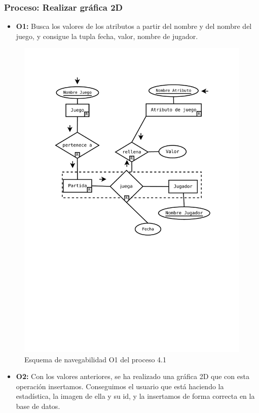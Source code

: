 \subsubsection{Proceso: Realizar gráfica 2D}

\begin{itemize}
	\item \textbf{O1:} Busca los valores de los atributos a partir del nombre y del nombre del juego, y consigue la tupla fecha, valor, nombre de jugador.
\end{itemize}

\begin{figure}[H]
	\centering
	\includegraphics[width=0.5\linewidth]{../Diagramas/pdf/OpEstadisticas3.pdf}
	\caption{Esquema de navegabilidad  O1 del proceso 4.1}
	
	\label{fig:O4.1}
\end{figure}
 \begin{itemize}
 	\item \textbf{O2:} Con los valores anteriores, se ha realizado una gráfica 2D que con esta operación insertamos. Conseguimos el usuario que está haciendo la estadística, la imagen de ella y su id, y la insertamos de forma correcta en la base de datos.
 \end{itemize}

